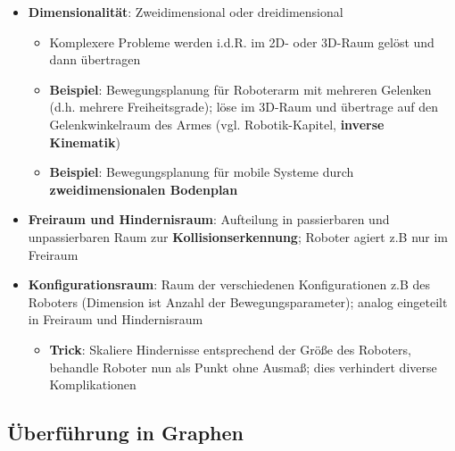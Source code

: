 \begin{itemize}
	\item \textbf{Dimensionalität}: Zweidimensional oder dreidimensional
	\begin{itemize}
		\item Komplexere Probleme werden i.d.R. im 2D- oder 3D-Raum gelöst und dann übertragen 
		\item \textbf{Beispiel}: Bewegungsplanung für Roboterarm mit mehreren Gelenken (d.h. mehrere Freiheitsgrade); löse im 3D-Raum und übertrage auf den Gelenkwinkelraum des Armes (vgl. Robotik-Kapitel, \textbf{inverse Kinematik})
		\item \textbf{Beispiel}: Bewegungsplanung für mobile Systeme durch \textbf{zweidimensionalen Bodenplan}
	\end{itemize}
	\item \textbf{Freiraum und Hindernisraum}: Aufteilung in passierbaren und unpassierbaren Raum zur \textbf{Kollisionserkennung}; Roboter agiert z.B nur im Freiraum
	\item \textbf{Konfigurationsraum}: Raum der verschiedenen Konfigurationen z.B des Roboters (Dimension ist Anzahl der Bewegungsparameter); analog eingeteilt in Freiraum und Hindernisraum
	\begin{itemize}
		\item \textbf{Trick}: Skaliere Hindernisse entsprechend der Größe des Roboters, behandle Roboter nun als Punkt ohne Ausmaß; dies verhindert diverse Komplikationen
	\end{itemize}
\end{itemize}

\subsection{Überführung in Graphen}%
\label{grep:sub:ueberfuehrung_in_graphen}

